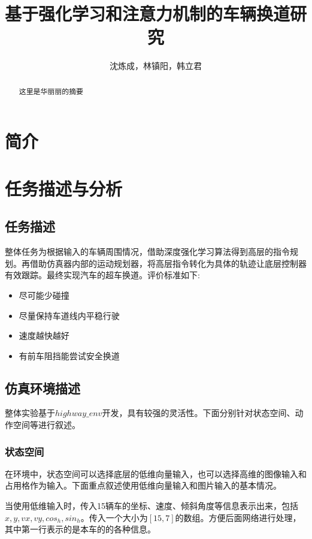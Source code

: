\documentclass[letterpaper, 10 pt, conference]{ieeeconf}  %
\title{\LARGE \bf
基于强化学习和注意力机制的车辆换道研究
}
\author{沈炼成，林镇阳，韩立君 }%
\begin{document}
\maketitle
\thispagestyle{empty}
\pagestyle{empty}


\begin{abstract}
这里是华丽丽的摘要


\end{abstract}


\section{简介}

\section{任务描述与分析}

\subsection{任务描述}

整体任务为根据输入的车辆周围情况，借助深度强化学习算法得到高层的指令规划。再借助仿真器内部的运动规划器，将高层指令转化为具体的轨迹让底层控制器有效跟踪。最终实现汽车的超车换道。评价标准如下:
\begin{itemize}
    \item 尽可能少碰撞
    \item 尽量保持车道线内平稳行驶
    \item 速度越快越好
    \item 有前车阻挡能尝试安全换道
\end{itemize}

\subsection{仿真环境描述}
整体实验基于$highway\_env$开发，具有较强的灵活性。下面分别针对状态空间、动作空间等进行叙述。
\subsubsection{状态空间}
在环境中，状态空间可以选择底层的低维向量输入，也可以选择高维的图像输入和占用格作为输入。下面重点叙述使用低维向量输入和图片输入的基本情况。

当使用低维输入时，传入15辆车的坐标、速度、倾斜角度等信息表示出来，包括$x,y,vx,vy,cos_h,sin_h$。传入一个大小为$[15,7]$的数组。方便后面网络进行处理，其中第一行表示的是本车的的各种信息。
\end{document}
